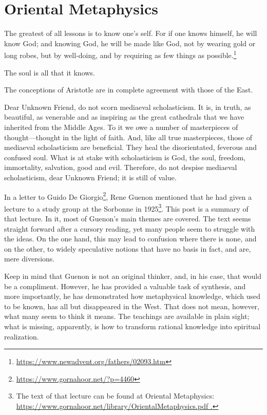 \section{Oriental Metaphysics}

\begin{quotex}
The greatest of all lessons is to know one's self. For if one knows himself, he will know God; and knowing God, he will be made like God, not by wearing gold or long robes, but by well-doing, and by requiring as few things as possible.\footnote{\url{https://www.newadvent.org/fathers/02093.htm}} 

The soul is all that it knows. 

The conceptions of Aristotle are in complete agreement with those of the East. 

Dear Unknown Friend, do not scorn mediaeval scholasticism. It is, in truth, as beautiful, as venerable and as inspiring as the great cathedrals that we have inherited from the Middle Ages. To it we owe a number of masterpieces of thought—thought in the light of faith. And, like all true masterpieces, those of mediaeval scholasticism are beneficial. They heal the disorientated, feverous and confused soul. What is at stake with scholasticism is God, the soul, freedom, immortality, salvation, good and evil. Therefore, do not despise mediaeval scholasticism, dear Unknown Friend; it is still of value. 

\end{quotex}
In a letter to Guido De Giorgio\footnote{\url{https://www.gornahoor.net/?p=4460}}, Rene Guenon mentioned that he had given a lecture to a study group at the Sorbonne in 1925\footnote{The text of that lecture can be found at Oriental Metaphysics: \url{https://www.gornahoor.net/library/OrientalMetaphysics.pdf .}}. This post is a summary of that lecture. In it, most of Guenon's main themes are covered. The text seems straight forward after a cursory reading, yet many people seem to struggle with the ideas. On the one hand, this may lead to confusion where there is none, and on the other, to widely speculative notions that have no basis in fact, and are, mere diversions.

Keep in mind that Guenon is not an original thinker, and, in his case, that would be a compliment. However, he has provided a valuable task of synthesis, and more importantly, he has demonstrated how metaphysical knowledge, which used to be known, has all but disappeared in the West. That does not mean, however, what many seem to think it means. The teachings are available in plain sight; what is missing, apparently, is how to transform rational knowledge into spiritual realization.

